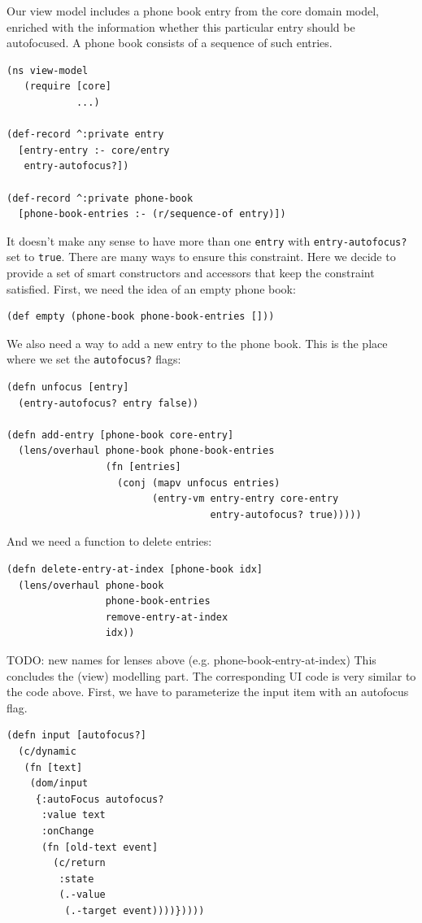 \documentclass[sigplan,screen]{acmart}
\begin{document}
Our view model includes a phone book entry from the core domain model,
enriched with the information whether this particular entry should be
autofocused. A phone book consists of a sequence of such entries.
%
\begin{verbatim}
(ns view-model
   (require [core]
            ...)

(def-record ^:private entry
  [entry-entry :- core/entry
   entry-autofocus?])

(def-record ^:private phone-book
  [phone-book-entries :- (r/sequence-of entry)])
\end{verbatim}
%
It doesn't make any sense to have more than one \texttt{entry} with
\texttt{entry-autofocus?} set to \texttt{true}. There are many ways to
ensure this constraint. Here we decide to provide a set of smart
constructors and accessors that keep the constraint satisfied. First,
we need the idea of an empty phone book:
%
\begin{verbatim}
(def empty (phone-book phone-book-entries []))
\end{verbatim}
%
We also need a way to add a new entry to the phone book. This is the
place where we set the \texttt{autofocus?} flags:
%
\begin{verbatim}
(defn unfocus [entry]
  (entry-autofocus? entry false))

(defn add-entry [phone-book core-entry]
  (lens/overhaul phone-book phone-book-entries
                 (fn [entries]
                   (conj (mapv unfocus entries)
                         (entry-vm entry-entry core-entry
                                   entry-autofocus? true)))))
\end{verbatim}
%
And we need a function to delete entries:
%
\begin{verbatim}
(defn delete-entry-at-index [phone-book idx]
  (lens/overhaul phone-book
                 phone-book-entries
                 remove-entry-at-index
                 idx))
\end{verbatim}
%
TODO: new names for lenses above (e.g. phone-book-entry-at-index)
%
This concludes the (view) modelling part. The corresponding UI code is
very similar to the code above. First, we have to parameterize the
input item with an autofocus flag.
%
\begin{verbatim}
(defn input [autofocus?]
  (c/dynamic
   (fn [text]
    (dom/input
     {:autoFocus autofocus?
      :value text
      :onChange
      (fn [old-text event]
        (c/return
         :state
         (.-value
          (.-target event))))}))))
\end{verbatim}
\end{document}
